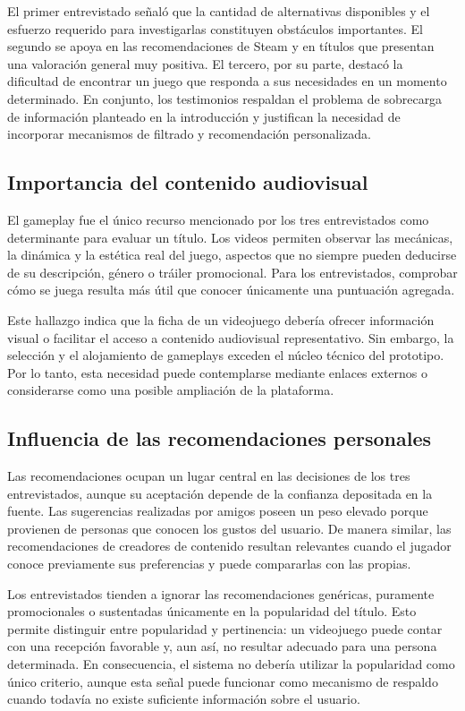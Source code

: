 El primer entrevistado señaló que la cantidad de alternativas disponibles y el esfuerzo requerido para investigarlas constituyen obstáculos importantes. El segundo se apoya en las recomendaciones de Steam y en títulos que presentan una valoración general muy positiva. El tercero, por su parte, destacó la dificultad de encontrar un juego que responda a sus necesidades en un momento determinado. En conjunto, los testimonios respaldan el problema de sobrecarga de información planteado en la introducción y justifican la necesidad de incorporar mecanismos de filtrado y recomendación personalizada.

\subsection{Importancia del contenido audiovisual}\label{subsec:importancia_audiovisual}

El gameplay fue el único recurso mencionado por los tres entrevistados como determinante para evaluar un título. Los videos permiten observar las mecánicas, la dinámica y la estética real del juego, aspectos que no siempre pueden deducirse de su descripción, género o tráiler promocional. Para los entrevistados, comprobar cómo se juega resulta más útil que conocer únicamente una puntuación agregada.

Este hallazgo indica que la ficha de un videojuego debería ofrecer información visual o facilitar el acceso a contenido audiovisual representativo. Sin embargo, la selección y el alojamiento de gameplays exceden el núcleo técnico del prototipo. Por lo tanto, esta necesidad puede contemplarse mediante enlaces externos o considerarse como una posible ampliación de la plataforma.

\subsection{Influencia de las recomendaciones personales}\label{subsec:influencia_recomendaciones}

Las recomendaciones ocupan un lugar central en las decisiones de los tres entrevistados, aunque su aceptación depende de la confianza depositada en la fuente. Las sugerencias realizadas por amigos poseen un peso elevado porque provienen de personas que conocen los gustos del usuario. De manera similar, las recomendaciones de creadores de contenido resultan relevantes cuando el jugador conoce previamente sus preferencias y puede compararlas con las propias.

Los entrevistados tienden a ignorar las recomendaciones genéricas, puramente promocionales o sustentadas únicamente en la popularidad del título. Esto permite distinguir entre popularidad y pertinencia: un videojuego puede contar con una recepción favorable y, aun así, no resultar adecuado para una persona determinada. En consecuencia, el sistema no debería utilizar la popularidad como único criterio, aunque esta señal puede funcionar como mecanismo de respaldo cuando todavía no existe suficiente información sobre el usuario.

